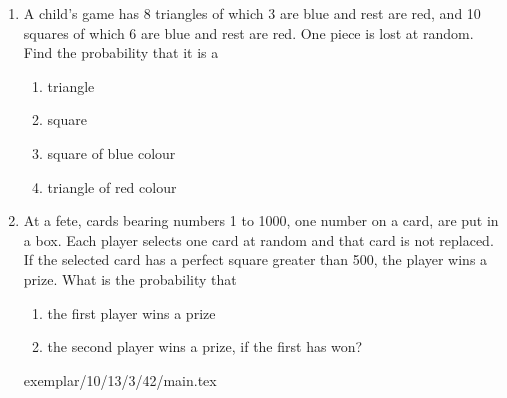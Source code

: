 \begin{enumerate}
\item A child's game has 8 triangles of which 3 are blue and rest are red, and 10 squares of which 6 are blue and rest are red. One piece is lost at random. Find the probability that it is a
\renewcommand{\labelenumi}{(\roman{enumi})}
\begin{enumerate}
\item triangle 
\item square 
\item square of blue colour 
\item triangle of red colour           
\end{enumerate}
\solution

\item At a fete, cards bearing numbers 1 to 1000, one number
on a card, are put in a box. Each player selects one card
at random and that card is not replaced. If the selected
card has a perfect square greater than 500, the player
wins a prize. What is the probability that
\renewcommand{\labelenumi}{(\roman{enumi})}
\begin{enumerate}
\item the first player wins a prize
\item the second player wins a prize, if the first has won? 
\end{enumerate}
\solution
 {exemplar/10/13/3/42/main.tex}
\end{enumerate}
